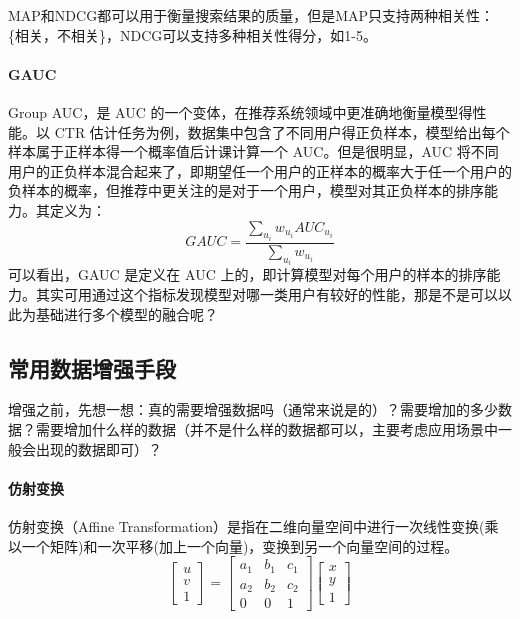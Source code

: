 MAP和NDCG都可以用于衡量搜索结果的质量，但是MAP只支持两种相关性：\{相关，不相关\}，NDCG可以支持多种相关性得分，如1-5。


\paragraph{GAUC}Group AUC，是 AUC 的一个变体，在推荐系统领域中更准确地衡量模型得性能。以 CTR 估计任务为例，数据集中包含了不同用户得正负样本，模型给出每个样本属于正样本得一个概率值后计课计算一个 AUC。但是很明显，AUC 将不同用户的正负样本混合起来了，即期望任一个用户的正样本的概率大于任一个用户的负样本的概率，但推荐中更关注的是对于一个用户，模型对其正负样本的排序能力。其定义为：
$$
GAUC = \frac{\sum_{u_i} w_{u_i} AUC_{u_i}}{\sum_{u_i} w_{u_i}}
$$
可以看出，GAUC 是定义在 AUC 上的，即计算模型对每个用户的样本的排序能力。其实可用通过这个指标发现模型对哪一类用户有较好的性能，那是不是可以以此为基础进行多个模型的融合呢？

\subsection{常用数据增强手段}
增强之前，先想一想：真的需要增强数据吗（通常来说是的）？需要增加的多少数据？需要增加什么样的数据（并不是什么样的数据都可以，主要考虑应用场景中一般会出现的数据即可）？
\paragraph{仿射变换}
仿射变换（Affine Transformation）是指在二维向量空间中进行一次线性变换(乘以一个矩阵)和一次平移(加上一个向量)，变换到另一个向量空间的过程。
$$
\left[\begin{array}{l}
	u \\
	v \\
	1
\end{array}\right]=\left[\begin{array}{ccc}
	a_{1} & b_{1} & c_{1} \\
	a_{2} & b_{2} & c_{2} \\
	0 & 0 & 1
\end{array}\right]\left[\begin{array}{l}
	x \\
	y \\
	1
\end{array}\right]
$$

